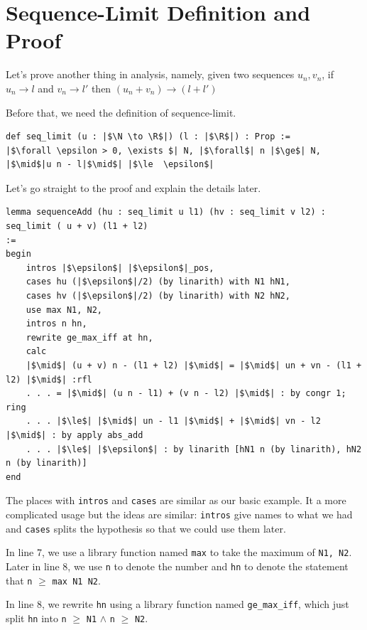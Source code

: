 \documentclass[a4paper]{article}
\newcommand{\R}{\mathbb{R}}
\newcommand{\N}{\mathbb{N}}
\theoremstyle{bfnote} %
\theoremstyle{bfnote}                  %
\theoremstyle{example}                       %
\theoremstyle{remark}                       %
\numberwithin{equation}{section}
\begin{document}
\section{Sequence-Limit Definition and Proof}

Let's prove another thing in analysis, namely, given two sequences $u_n, v_n$, if $u_n \to l$ and $v_n \to l'$ then $(u_n + v_n) \to (l+l')$

Before that, we need the definition of sequence-limit.

\begin{verbatim}
def seq_limit (u : |$\N \to \R$|) (l : |$\R$|) : Prop :=
|$\forall \epsilon > 0, \exists $| N, |$\forall$| n |$\ge$| N, |$\mid$|u n - l|$\mid$| |$\le  \epsilon$|
\end{verbatim}	

Let's go straight to the proof and explain the details later.

\begin{listing}[!h]
\begin{verbatim}
lemma sequenceAdd (hu : seq_limit u l1) (hv : seq_limit v l2) :
seq_limit ( u + v) (l1 + l2)
:=
begin
	intros |$\epsilon$| |$\epsilon$|_pos,
	cases hu (|$\epsilon$|/2) (by linarith) with N1 hN1,
	cases hv (|$\epsilon$|/2) (by linarith) with N2 hN2,
	use max N1, N2,
	intros n hn,
	rewrite ge_max_iff at hn,
	calc
	|$\mid$| (u + v) n - (l1 + l2) |$\mid$| = |$\mid$| un + vn - (l1 + l2) |$\mid$| :rfl 
	. . . = |$\mid$| (u n - l1) + (v n - l2) |$\mid$| : by congr 1; ring 
	. . . |$\le$| |$\mid$| un - l1 |$\mid$| + |$\mid$| vn - l2 |$\mid$| : by apply abs_add 
	. . . |$\le$| |$\epsilon$| : by linarith [hN1 n (by linarith), hN2 n (by linarith)]
end
\end{verbatim}
\end{listing}
The places with \texttt{intros} and \texttt{cases} are similar as our basic example. It a more complicated usage but the ideas are similar: \texttt{intros} give names to what we had and \texttt{cases} splits the hypothesis so that we could use them later.

In line 7, we use a library function named \texttt{max} to take the maximum of \texttt{N1, N2}. Later in line 8, we use \texttt{n} to denote the number and \texttt{hn} to denote the statement that \texttt{n} $\ge$ \texttt{max N1 N2}.

In line 8, we rewrite \texttt{hn} using a library function named  \texttt{ge\_max\_iff}, which just split \texttt{hn} into \texttt{n} $\ge$ \texttt{N1} $\wedge$  \texttt{n} $\ge $ \texttt{N2}. 
\end{document}
